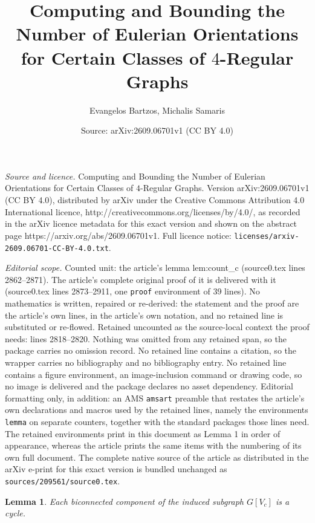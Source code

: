 \documentclass[10pt,a4paper]{amsart}
\title{Computing and Bounding the Number of Eulerian Orientations for Certain Classes of $4$-Regular Graphs}
\author{Evangelos Bartzos, Michalis Samaris}
\date{Source: arXiv:2609.06701v1 (CC BY 4.0)}
\newtheorem{lemma}{Lemma}
\begin{document}
\maketitle

\noindent\emph{Source and licence.} Computing and Bounding the Number of Eulerian Orientations for Certain Classes of $4$-Regular Graphs. Version arXiv:2609.06701v1 (CC BY 4.0), distributed by arXiv under the Creative Commons Attribution 4.0 International licence, http://creativecommons.org/licenses/by/4.0/, as recorded in the arXiv licence metadata for this exact version and shown on the abstract page https://arxiv.org/abs/2609.06701v1. Full licence notice: \texttt{licenses/arxiv-2609.06701-CC-BY-4.0.txt}.\par\smallskip

\noindent\textit{Editorial scope.} Counted unit: the article's lemma lem:count\_c (source0.tex lines 2862--2871). The article's complete original proof of it is delivered with it (source0.tex lines 2873--2911, one \texttt{proof} environment of 39 lines). No mathematics is written, repaired or re-derived: the statement and the proof are the article's own lines, in the article's own notation, and no retained line is substituted or re-flowed.  Retained uncounted as the source-local context the proof needs: lines 2818--2820.  Nothing was omitted from any retained span, so the package carries no omission record.  No retained line contains a citation, so the wrapper carries no bibliography and no bibliography entry.  No retained line contains a figure environment, an image-inclusion command or drawing code, so no image is delivered and the package declares no asset dependency.  Editorial formatting only, in addition: an AMS \texttt{amsart} preamble that restates the article's own declarations and macros used by the retained lines, namely the environments \texttt{lemma} on separate counters, together with the standard packages those lines need.  The retained environments print in this document as Lemma 1 in order of appearance, whereas the article prints the same items with the numbering of its own full document.  The complete native source of the article as distributed in the arXiv e-print for this exact version is bundled unchanged as \texttt{sources/209561/source0.tex}.
        \begin{lemma}\label{lem:structure 4regular}
            Each biconnected component of the induced subgraph $G[V_c]$ is a cycle.
        \end{lemma}
\end{document}
